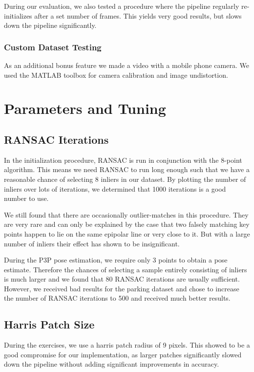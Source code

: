 \documentclass[11pt]{article}
\begin{document}
During our evaluation, we also tested a procedure where the pipeline regularly re-initializes after a set number of frames. This yields very good results, but slows down the pipeline significantly.

\subsubsection{Custom Dataset Testing}
As an additional bonus feature we made a video with a mobile phone camera. We used the MATLAB toolbox for camera calibration and image undistortion.

\section{Parameters and Tuning}
\subsection{RANSAC Iterations}
In the initialization procedure, RANSAC is run in conjunction with the 8-point algorithm. This means we need RANSAC to run long enough such that we have a reasonable chance of selecting 8 inliers in our dataset. By plotting the number of inliers over lots of iterations, we determined that 1000 iterations is a good number to use.

We still found that there are occasionally outlier-matches in this procedure. They are very rare and can only be explained by the case that two falsely matching key points happen to lie on the same epipolar line or very close to it. But with a large number of inliers their effect has shown to be insignificant.

During the P3P pose estimation, we require only 3 points to obtain a pose estimate. Therefore the chances of selecting a sample entirely consisting of inliers is much larger and we found that 80 RANSAC iterations are usually sufficient. However, we received bad results for the parking dataset and chose to increase the number of RANSAC iterations to 500 and received much better results.

\subsection{Harris Patch Size}
During the exercises, we use a harris patch radius of 9 pixels. This showed to be a good compromise for our implementation, as larger patches significantly slowed down the pipeline without adding significant improvements in accuracy.
\end{document}

